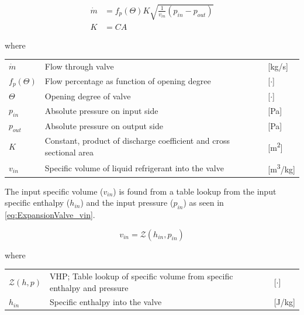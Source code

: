 \begin{equation} \label{eq:ExpansionValve_Alt}
	\begin{split}
		\dot{m} & = f_p(\Theta) K  \sqrt{\frac{1}{v_{in}} (p_{in} - p_{out})} \\
		K       & = C A
	\end{split}
\end{equation}

where

\begin{center}
	\begin{tabular}{l p{8cm} l}
		$\dot{m}$     & Flow through valve                                                  & [\si{kg}/\si{s}]   \\
		$f_p(\Theta)$ & Flow percentage as function of opening degree                       & [$\cdot$]          \\
		$ \Theta $    & Opening degree of valve                                             & [$ \cdot $]        \\
		$p_{in}$      & Absolute pressure on input side                                     & [\si{Pa}]          \\
		$p_{out}$     & Absolute pressure on output side                                    & [\si{Pa}]          \\
		$K$           & Constant, product of discharge coefficient and cross sectional area & [\si{m^2}]         \\
		$v_{in}$      & Specific volume of liquid refrigerant into the valve                & [\si{m^3}/\si{kg}]
	\end{tabular}
\end{center}

The input specific volume ($v_{in}$) is found from a table lookup from the input specific enthalpy ($h_{in}$) and the input pressure ($p_{in}$) as seen in \cref{eq:ExpansionValve_vin}.


\begin{equation} \label{eq:ExpansionValve_vin}
	v_{in} = \mathcal{Z}(h_{in}, p_{in})
\end{equation}

where

\begin{center}
	\begin{tabular}{l p{10cm} l}
		$\mathcal{Z}(h, p)$ & VHP; Table lookup of specific volume from specific enthalpy and pressure & [$\cdot$] \\
		$h_{in}$            & Specific enthalpy into the valve                                    & [\si{J}/\si{kg}]
	\end{tabular}
\end{center}

